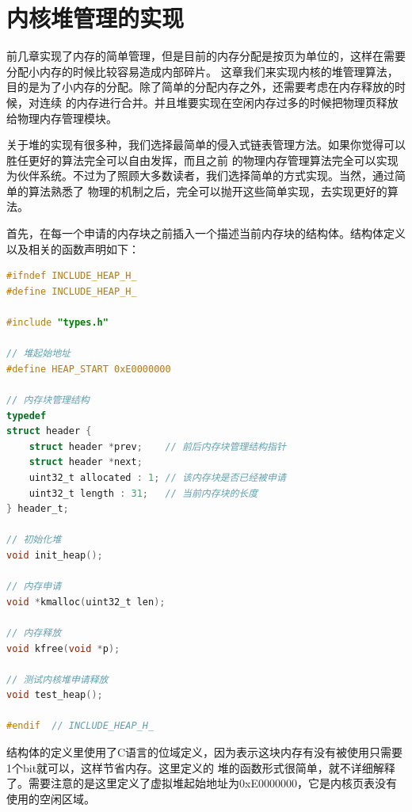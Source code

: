 
\section {内核堆管理的实现}

\par 前几章实现了内存的简单管理，但是目前的内存分配是按页为单位的，这样在需要分配小内存的时候比较容易造成内部碎片。\allowbreak
这章我们来实现内核的堆管理算法，目的是为了小内存的分配。除了简单的分配内存之外，还需要考虑在内存释放的时候，对连续\allowbreak
的内存进行合并。并且堆要实现在空闲内存过多的时候把物理页释放给物理内存管理模块。

\par 关于堆的实现有很多种，我们选择最简单的侵入式链表管理方法。如果你觉得可以胜任更好的算法完全可以自由发挥，而且之前\allowbreak
的物理内存管理算法完全可以实现为伙伴系统。不过为了照顾大多数读者，我们选择简单的方式实现。当然，通过简单的算法熟悉了\allowbreak
物理的机制之后，完全可以抛开这些简单实现，去实现更好的算法。

\par 首先，在每一个申请的内存块之前插入一个描述当前内存块的结构体。结构体定义以及相关的函数声明如下：

\begin{lstlisting}[language = C, caption = include/heap.h]
#ifndef INCLUDE_HEAP_H_
#define INCLUDE_HEAP_H_

#include "types.h"

// 堆起始地址
#define HEAP_START 0xE0000000

// 内存块管理结构
typedef
struct header {
	struct header *prev; 	// 前后内存块管理结构指针
	struct header *next;
	uint32_t allocated : 1;	// 该内存块是否已经被申请
	uint32_t length : 31; 	// 当前内存块的长度
} header_t;

// 初始化堆
void init_heap();

// 内存申请
void *kmalloc(uint32_t len);

// 内存释放
void kfree(void *p);

// 测试内核堆申请释放
void test_heap();

#endif 	// INCLUDE_HEAP_H_
\end{lstlisting}

\par 结构体的定义里使用了C语言的位域定义，因为表示这块内存有没有被使用只需要1个bit就可以，这样节省内存。这里定义的\allowbreak
堆的函数形式很简单，就不详细解释了。需要注意的是这里定义了虚拟堆起始地址为0xE0000000，它是内核页表没有使用的空闲区域。

